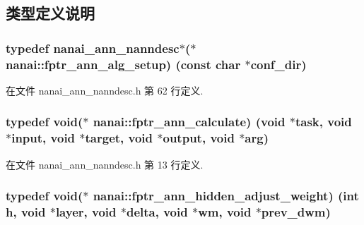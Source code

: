 \subsection{类型定义说明}
\hypertarget{namespacenanai_af358544d3d83ecb56361b1eaa46a0e98}{}
\subsubsection[{fptr\+\_\+ann\+\_\+alg\+\_\+setup}]{\setlength{\rightskip}{0pt plus 5cm}typedef {\bf nanai\+\_\+ann\+\_\+nanndesc}$\ast$($\ast$ nanai\+::fptr\+\_\+ann\+\_\+alg\+\_\+setup) (const char $\ast$conf\+\_\+dir)}\label{namespacenanai_af358544d3d83ecb56361b1eaa46a0e98}


在文件 nanai\+\_\+ann\+\_\+nanndesc.\+h 第 62 行定义.

\hypertarget{namespacenanai_ac1a3ebd721fc3cfe1b9accfe7b65b7fe}{}
\subsubsection[{fptr\+\_\+ann\+\_\+calculate}]{\setlength{\rightskip}{0pt plus 5cm}typedef void($\ast$ nanai\+::fptr\+\_\+ann\+\_\+calculate) (void $\ast$task, void $\ast$input, void $\ast$target, void $\ast$output, void $\ast$arg)}\label{namespacenanai_ac1a3ebd721fc3cfe1b9accfe7b65b7fe}


在文件 nanai\+\_\+ann\+\_\+nanndesc.\+h 第 13 行定义.

\hypertarget{namespacenanai_a1d9a4524c199b1a2891e208ce4b05306}{}
\subsubsection[{fptr\+\_\+ann\+\_\+hidden\+\_\+adjust\+\_\+weight}]{\setlength{\rightskip}{0pt plus 5cm}typedef void($\ast$ nanai\+::fptr\+\_\+ann\+\_\+hidden\+\_\+adjust\+\_\+weight) (int h, void $\ast$layer, void $\ast$delta, void $\ast$wm, void $\ast$prev\+\_\+dwm)}\label{namespacenanai_a1d9a4524c199b1a2891e208ce4b05306}


